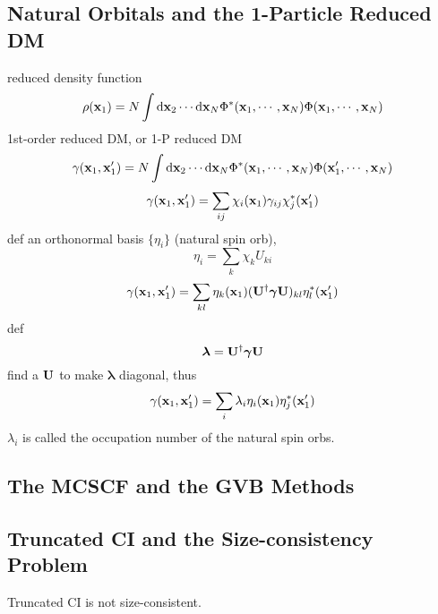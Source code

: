\documentclass[a4paper]{article}
\numberwithin{equation}{section}
\begin{document}
\subsection{Natural Orbitals and the 1-Particle Reduced DM}
reduced density function
\begin{equation}\label{key}
\rho(\vb{x}_1) = N\int \dd\vb{x}_2\cdots\dd\vb{x}_N \Phi^*(\vb{x}_1,\cdots,\vb{x}_N)\Phi(\vb{x}_1,\cdots,\vb{x}_N)
\end{equation}
1st-order reduced DM, or 1-P reduced DM
\begin{equation}\label{key}
\gamma(\vb{x}_1,\vb{x}'_1) = N\int \dd\vb{x}_2\cdots\dd\vb{x}_N \Phi^*(\vb{x}_1,\cdots,\vb{x}_N)\Phi(\vb{x}'_1,\cdots,\vb{x}_N)
\end{equation}
\begin{equation}\label{key}
\gamma(\vb{x}_1,\vb{x}'_1) = \sum_{ij} \chi_i(\vb{x}_1) \gamma_{ij} \chi_j^*(\vb{x}'_1)
\end{equation}
def an orthonormal basis $ \{\eta_i\} $ (natural spin orb), 
\begin{equation}\label{key}
\eta_i = \sum_k \chi_k U_{ki}
\end{equation}
\begin{equation}\label{key}
\gamma(\vb{x}_1,\vb{x}'_1) = \sum_{kl} \eta_k(\vb{x}_1) (\vb{U}^\dagger\bm\gamma\vb{U})_{kl} \eta_l^*(\vb{x}'_1)
\end{equation}
def 
\begin{equation}\label{key}
\bm\lambda = \vb{U}^\dagger\bm\gamma\vb{U}
\end{equation}
find a $ \vb{U} $ to make $ \bm\lambda $ diagonal, thus
\begin{equation}\label{key}
\gamma(\vb{x}_1,\vb{x}'_1) = \sum_{i} \lambda_i \eta_i(\vb{x}_1)  \eta_j^*(\vb{x}'_1)
\end{equation}
$ \lambda_i $ is called the occupation number of the natural spin orbs.

\subsection{The MCSCF and the GVB Methods}

\subsection{Truncated CI and the Size-consistency Problem}
Truncated CI is not size-consistent.
\end{document}
